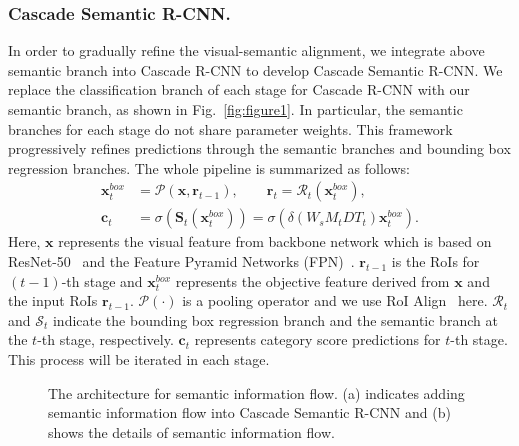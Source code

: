 \documentclass[runningheads]{llncs}
\begin{document}
\subsubsection{Cascade Semantic R-CNN.\label{Cascade Semantic R-CNN}}
In order to gradually refine the visual-semantic alignment, we integrate above semantic branch into Cascade R-CNN to develop Cascade Semantic R-CNN. We replace the classification branch of each stage for Cascade R-CNN with our semantic branch, as shown in Fig.~\ref{fig:figure1}. In particular, the semantic branches for each stage do not share parameter weights. This framework progressively refines predictions through the semantic branches and bounding box regression branches. The whole pipeline is summarized as follows: 
\begin{equation}
\begin{split}
    \mathbf{x}_{t}^{box} &= \mathcal{P}(\mathbf{x}, \mathbf{r}_{t-1}),  \qquad  \mathbf{r}_{t} = \mathcal{R}_{t}(\mathbf{x}_{t}^{box}), \\
    \mathbf{c}_{t} &= \sigma(\mathbf{S}_{t}(\mathbf{x}_{t}^{box})) = \sigma(\delta(W_{s}M_{t}DT_{t})\mathbf{x}_{t}^{box}).
\end{split}
\label{con:cas-sem}
\end{equation}
Here, $\mathbf{x}$ represents the visual feature from backbone network which is based on ResNet-50~\cite{he2016deep} and the Feature Pyramid Networks (FPN)~\cite{lin2017feature}. 
$\mathbf{r}_{t-1}$ is the RoIs for $(t-1)$-th stage and $\mathbf{x}^{box}_{t}$ represents the objective feature derived from ${\mathbf{x}}$ and the input RoIs $\mathbf{r}_{t-1}$. $\mathcal{P}(\cdot)$ is a pooling operator and we use RoI Align~\cite{maskrcnn} here. $\mathcal{R}_{t}$ and $\mathcal{S}_{t}$ indicate the bounding box regression branch and the semantic branch at the $t$-th stage, respectively. $\mathbf{c}_{t}$ represents category score predictions for $t$-th stage. This process will be iterated in each stage.
\begin{figure}[tbp]
\centering
{}
\caption{The architecture for semantic information flow. (a) indicates adding semantic information flow into Cascade Semantic R-CNN and (b) shows the details of semantic information flow.}
\label{fig:figure2}
\end{figure}
\end{document}
